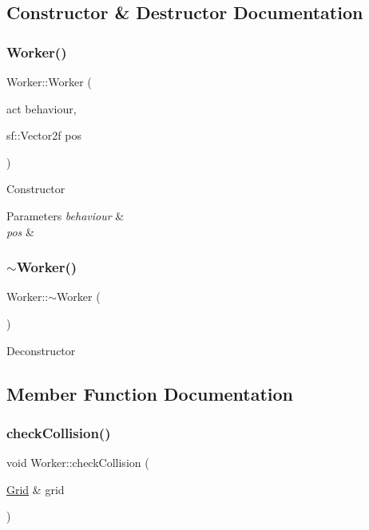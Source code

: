 \subsection{Constructor \& Destructor Documentation}
\mbox{\label{class_worker_ac70dfea860cf30817650e750ed924c08}} 
\subsubsection{\texorpdfstring{Worker()}{Worker()}}
{\footnotesize\ttfamily Worker\+::\+Worker (\begin{DoxyParamCaption}\item[{act}]{behaviour,  }\item[{sf\+::\+Vector2f}]{pos }\end{DoxyParamCaption})}



Constructor 


\begin{DoxyParams}{Parameters}
{\em behaviour} & \\
\hline
{\em pos} & \\
\hline
\end{DoxyParams}
\mbox{\label{class_worker_aa8e4543ef1e93fd9d884269ba30c5bfe}} 
\subsubsection{\texorpdfstring{$\sim$Worker()}{~Worker()}}
{\footnotesize\ttfamily Worker\+::$\sim$\+Worker (\begin{DoxyParamCaption}{ }\end{DoxyParamCaption})}



Deconstructor 



\subsection{Member Function Documentation}
\mbox{\label{class_worker_a1b3dae07dd02fed908d3864d02f481d8}} 
\subsubsection{\texorpdfstring{checkCollision()}{checkCollision()}}
{\footnotesize\ttfamily void Worker\+::check\+Collision (\begin{DoxyParamCaption}\item[{\mbox{\hyperlink{class_grid}{Grid}} \&}]{grid }\end{DoxyParamCaption})}



